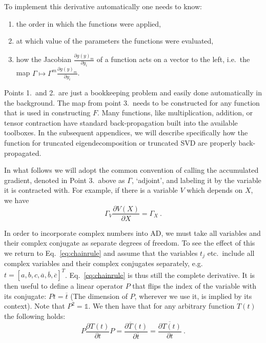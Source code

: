 \documentclass[twocolumn,floatfix,superscriptaddress,longbibliography,pra]{revtex4-2}
\begin{document}
To implement this derivative automatically one needs to know: 
\begin{enumerate}
    \item the order in which the functions were applied,
    \item at which value of the parameters the functions were evaluated,
    \item how the Jacobian 
   $\frac{\partial g(y)_m}{\partial y_i}$  of a function acts on a vector to the left, i.e.\ the map $\Gamma\mapsto\Gamma^m\frac{\partial g(y)_m}{\partial y_i}$.
\end{enumerate}
Points 1.\ and 2.\ are just a bookkeeping problem and easily done automatically in the background. The map from point 3.\ needs to be constructed for any function that is used in constructing $F$. Many functions, like multiplication, addition, or tensor contraction have standard back-propagation built into the available toolboxes. In the subsequent appendices, we will describe specifically how the function for truncated eigendecomposition or truncated SVD are properly back-propagated.

In what follows we will adopt the common convention of calling the accumulated gradient, denoted in Point 3.\ above as $\Gamma$, `adjoint', and labeling it by the variable it is contracted with. For example, if there is a variable $V$ which depends on $X$, we have 
\begin{equation}
    \Gamma_V\frac{\partial V(X)}{\partial X}=\Gamma_X\ .
\end{equation}

In order to incorporate complex numbers into AD, we must take all variables and their complex conjugate as separate degrees of freedom. To see the effect of this we return to Eq.~\eqref{eq:chainrule} and assume that the variables $t_j$ etc.\ include all complex variables and their complex conjugates separately, e.g.\ $t=[a,b,c,\overline{a},\overline{b},\overline{c}]^T$. Eq.~\eqref{eq:chainrule} is thus still the complete derivative. It is then useful to define a linear operator $P$ that flips the index of the variable with its conjugate: $Pt=\overline{t}$ (The dimension of $P$, wherever we use it, is implied by its context). Note that $P^2=\mathbb{1}$. 
We then have that for any arbitrary function $T(t)$ the following holds:
\begin{equation}
    P\frac{\partial T(t)}{\partial t}P = \frac{\partial \overline{T}(t)}{\partial \overline{t}}=\overline{\frac{\partial T(t)}{\partial t}}\ .
\end{equation}
\end{document}
